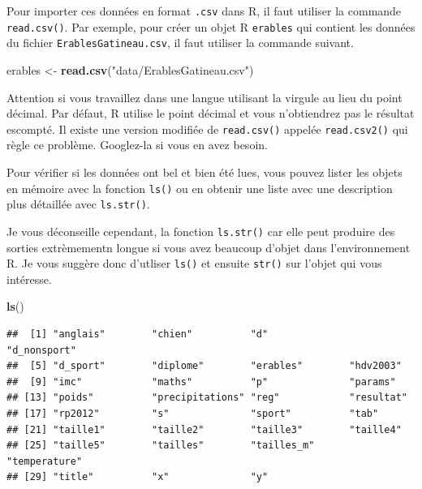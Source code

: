 \documentclass[12pt,]{book}
\makeatletter
\newenvironment{Shaded}{\begin{snugshade}}{\end{snugshade}}
\newcommand{\KeywordTok}[1]{\textcolor[rgb]{0.13,0.29,0.53}{\textbf{#1}}}
\newcommand{\NormalTok}[1]{#1}
\newcommand{\StringTok}[1]{\textcolor[rgb]{0.31,0.60,0.02}{#1}}
\newenvironment{kframe}{%
\medskip{}
\setlength{\fboxsep}{.8em}
\def\at@end@of@kframe{}%
\ifinner\ifhmode%
 \def\at@end@of@kframe{\end{minipage}}%
 \begin{minipage}{\columnwidth}%
\fi\fi%
\def\FrameCommand##1{\hskip\@totalleftmargin \hskip-\fboxsep
\colorbox{incolor}{##1}\hskip-\fboxsep
    \hskip-\linewidth \hskip-\@totalleftmargin \hskip\columnwidth}%
\MakeFramed {\advance\hsize-\width
  \@totalleftmargin\z@ \linewidth\hsize
  \@setminipage}}%
{\par\unskip\endMakeFramed%
\at@end@of@kframe}
\newenvironment{rmdblock}[1]
 {
 \begin{itemize}
 \renewcommand{\labelitemi}{
   \raisebox{-.7\height}[0pt][0pt]{
     {\setkeys{Gin}{width=3em,keepaspectratio}\texttt{[image: images/\#1]}}
   }
 }
 \begin{kframe}
 \setlength{\fboxsep}{1em}
 \item
 }
 {
 \end{kframe}
 \end{itemize}
 }
\newenvironment{rmdtip}
  {\begin{rmdblock}{tip}}
  {\end{rmdblock}}
\newenvironment{rmdwarning}
  {\begin{rmdblock}{warning}}
  {\end{rmdblock}}
\makeatother
\begin{document}
Pour importer ces données en format \texttt{.csv} dans R, il faut utiliser la commande \texttt{read.csv()}.
Par exemple, pour créer un objet R \texttt{erables} qui contient les données du fichier \texttt{ErablesGatineau.csv}, il faut utiliser la commande suivant.

\begin{Shaded}
\begin{Highlighting}[]
\NormalTok{erables <-}\StringTok{ }\KeywordTok{read.csv}\NormalTok{(}\StringTok{"data/ErablesGatineau.csv"}\NormalTok{)}
\end{Highlighting}
\end{Shaded}

\begin{rmdwarning}
Attention si vous travaillez dans une langue utilisant la virgule au lieu du point décimal.
Par défaut, R utilise le point décimal et vous n'obtiendrez pas le résultat escompté.
Il existe une version modifiée de \texttt{read.csv()} appelée \texttt{read.csv2()} qui règle ce problème.
Googlez-la si vous en avez besoin.
\end{rmdwarning}

Pour vérifier si les données ont bel et bien été lues, vous pouvez lister les objets en mémoire avec la fonction \texttt{ls()} ou en obtenir une liste avec une description plus détaillée avec \texttt{ls.str()}.

\begin{rmdtip}
Je vous déconseille cependant, la fonction \texttt{ls.str()} car elle peut produire des sorties extrèmementn longue si vous avez beaucoup d'objet dans l'environnement R. Je vous suggère donc d'utliser \texttt{ls()} et ensuite \texttt{str()} sur l'objet qui vous intéresse.
\end{rmdtip}

\begin{Shaded}
\begin{Highlighting}[]
\KeywordTok{ls}\NormalTok{()}
\end{Highlighting}
\end{Shaded}

\begin{verbatim}
##  [1] "anglais"        "chien"          "d"              "d_nonsport"    
##  [5] "d_sport"        "diplome"        "erables"        "hdv2003"       
##  [9] "imc"            "maths"          "p"              "params"        
## [13] "poids"          "precipitations" "reg"            "resultat"      
## [17] "rp2012"         "s"              "sport"          "tab"           
## [21] "taille1"        "taille2"        "taille3"        "taille4"       
## [25] "taille5"        "tailles"        "tailles_m"      "temperature"   
## [29] "title"          "x"              "y"
\end{verbatim}
\end{document}
